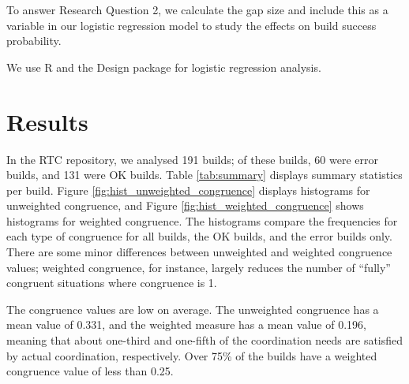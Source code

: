 
To answer Research Question 2, we calculate the gap size and include this as a variable in our logistic regression model to study the effects on build success probability.


We use R \cite{R} and the Design package \cite{designR} for logistic regression analysis.



\section{Results}
\label{sec:results}

In the RTC repository, we analysed 191 builds; of these builds, 60 were error builds, and 131 were OK builds. Table \ref{tab:summary} displays summary statistics per build.
Figure \ref{fig:hist_unweighted_congruence} displays histograms for unweighted congruence, and Figure \ref{fig:hist_weighted_congruence} shows histograms for weighted congruence. The histograms compare the frequencies for each type of congruence for all builds, the OK builds, and the error builds only. There are some minor differences between unweighted and weighted congruence values; weighted congruence, for instance, largely reduces the number of ``fully'' congruent situations where congruence is 1.



The congruence values are low on average. The unweighted congruence has a mean value of 0.331, and the weighted measure has a mean value of 0.196, meaning that about one-third and one-fifth of the coordination needs are satisfied by actual coordination, respectively. Over 75\% of the builds have a weighted congruence value of less than 0.25.


